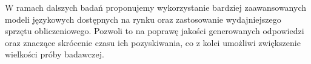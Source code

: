 \documentclass{article}
\begin{document}
W ramach dalszych badań proponujemy wykorzystanie bardziej zaawansowanych modeli językowych dostępnych na rynku oraz zastosowanie wydajniejszego sprzętu obliczeniowego. Pozwoli to na poprawę jakości generowanych odpowiedzi oraz znaczące skrócenie czasu ich pozyskiwania, co z kolei umożliwi zwiększenie wielkości próby badawczej.
\end{document}
